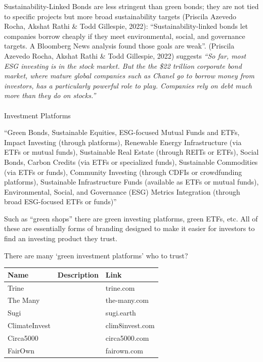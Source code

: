 \documentclass[
  letterpaper,
  DIV=11,
  numbers=noendperiod]{scrartcl}
\makeatletter
\let\oldparagraph\paragraph
\renewcommand{\paragraph}{
    \@ifstar
      \xxxParagraphStar
      \xxxParagraphNoStar
  }
\newcommand{\xxxParagraphStar}[1]{\oldparagraph*{#1}\mbox{}}
\newcommand{\xxxParagraphNoStar}[1]{\oldparagraph{#1}\mbox{}}
\makeatother
\begin{document}
Sustainability-Linked Bonds are less stringent than green bonds; they
are not tied to specific projects but more broad sustainability targets
(Priscila Azevedo Rocha, Akshat Rathi \& Todd Gillespie, 2022):
``Sustainability-linked bonds let companies borrow cheaply if they meet
environmental, social, and governance targets. A Bloomberg News analysis
found those goals are weak''. (Priscila Azevedo Rocha, Akshat Rathi \&
Todd Gillespie, 2022) suggests \emph{``So far, most ESG investing is in
the stock market. But the the \$22 trillion corporate bond market, where
mature global companies such as Chanel go to borrow money from
investors, has a particularly powerful role to play. Companies rely on
debt much more than they do on stocks.''}

\paragraph{Investment Platforms}\label{investment-platforms}

``Green Bonds, Sustainable Equities, ESG-focused Mutual Funds and ETFs,
Impact Investing (through platforms), Renewable Energy Infrastructure
(via ETFs or mutual funds), Sustainable Real Estate (through REITs or
ETFs), Social Bonds, Carbon Credits (via ETFs or specialized funds),
Sustainable Commodities (via ETFs or funds), Community Investing
(through CDFIs or crowdfunding platforms), Sustainable Infrastructure
Funds (available as ETFs or mutual funds), Environmental, Social, and
Governance (ESG) Metrics Integration (through broad ESG-focused ETFs or
funds)''

Such as ``green shops'' there are green investing platforms, green ETFs,
etc. All of these are essentially forms of branding designed to make it
easier for investors to find an investing product they trust.

There are many `green investment platforms' who to trust?

\begin{longtable}[]{@{}lll@{}}
\toprule\noalign{}
Name & Description & Link \\
\midrule\noalign{}
\endhead
\bottomrule\noalign{}
\endlastfoot
Trine & & trine.com \\
The Many & & the-many.com \\
Sugi & & sugi.earth \\
ClimateInvest & & clim8invest.com \\
Circa5000 & & circa5000.com \\
FairOwn & & fairown.com \\
\end{longtable}
\end{document}
